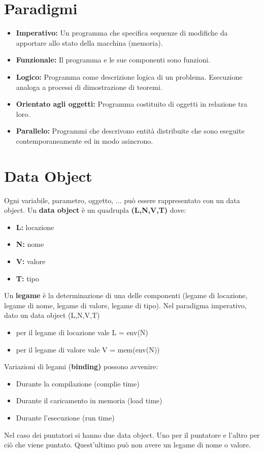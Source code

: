 \documentclass[10pt]{article}
\begin{document}
\section{Paradigmi}
\begin{itemize}
\item 
\textbf{Imperativo:}  Un programma che specifica sequenze di modifiche da apportare allo stato della macchina (memoria).
\item 
\textbf{Funzionale:}  Il programma e le sue componenti sono funzioni.
\item 
\textbf{Logico:}  Programma come descrizione logica di un problema. Esecuzione analoga a processi di dimostrazione di teoremi.
\item 
\textbf{Orientato agli oggetti:}  Programma costituito di oggetti in relazione tra loro.
\item 
\textbf{Parallelo:} Programmi che descrivono entità distribuite che sono eseguite contemporaneamente ed in modo asincrono.
\end{itemize}
\section{Data Object}
Ogni variabile, parametro, oggetto, ... può essere rappresentato con un data object.
Un \textbf{data object} è un quadrupla \textbf{(L,N,V,T)} dove:
\begin{itemize}
    \item \textbf{L:} locazione
    \item \textbf{N:} nome
    \item\textbf{V:} valore
    \item\textbf{T:} tipo
\end{itemize}

Un \textbf{legame} è la determinazione di una delle componenti (legame di locazione, legame di nome, legame di valore, legame di tipo).
Nel paradigma imperativo, dato un data object (L,N,V,T)
\begin{itemize}
    \item per il legame di locazione vale L = env(N)
    \item per il legame di valore vale V = mem(env(N))
\end{itemize}
Variazioni di legami (\textbf{binding)} possono avvenire:
\begin{itemize}
    \item Durante la compilazione (complie time)
    \item Durante il caricamento in memoria (load time)
    \item Durante l'esecuzione (run time)
\end{itemize}
Nel caso dei puntatori si hanno due data object.
Uno per il puntatore e l'altro per ciò che viene puntato. 
Quest'ultimo può non avere un legame di nome o valore.
\end{document}
